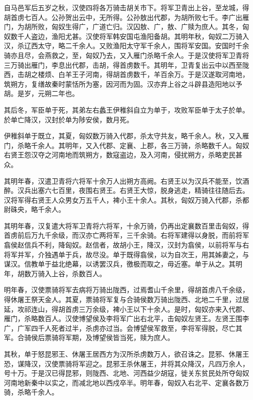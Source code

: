 \documentclass[12pt,UTF8]{ctexbook}
\begin{document}
自马邑军后五岁之秋，汉使四将各万骑击胡关市下。将军卫青出上谷，至龙城，得胡首虏七百人。公孙贺出云中，无所得。公孙敖出代郡，为胡所败七千。李广出雁门，为胡所败，匈奴生得广，广道亡归。汉囚敖、广，敖、广赎为庶人。其冬，匈奴数千人盗边，渔阳尤甚。汉使将军韩安国屯渔阳备胡。其明年秋，匈奴二万骑入汉，杀辽西太守，略二千余人。又败渔阳太守军千余人，围将军安国。安国时千余骑亦且尽，会燕救之，至，匈奴乃去，又入雁门杀略千余人。于是汉使将军卫青将三万骑出雁门，李息出代郡，击胡，得首虏数千。其明年，卫青复出云中以西至陇西，击胡之楼烦、白羊王子河南，得胡首虏数千，羊百余万。于是汉遂取河南地，筑朔方，复缮故秦时蒙恬所为塞，因河而为固。汉亦弃上谷之斗辟县造阳地以予胡。是岁，元朔二年也。



其后冬，军臣单于死，其弟左右蠡王伊稚斜自立为单于，攻败军臣单于太子於单。於单亡降汉，汉封於单为陟安侯，数月死。



伊稚斜单于既立，其夏，匈奴数万骑入代郡，杀太守共友，略千余人。秋，又入雁门，杀略千余人。其明年，又入代郡、定襄、上郡，各三万骑，杀略数千人。匈奴右贤王怨汉夺之河南地而筑朔方，数寇盗边，及入河南，侵扰朔方，杀略吏民甚众。



其明年春，汉遣卫青将六将军十余万人出朔方高阙。右贤王以为汉兵不能至，饮酒醉。汉兵出塞六七百里，夜围右贤王。右贤王大惊，脱身逃走，精骑往往随后去。汉将军得右贤王人众男女万五千人，裨小王十余人。其秋，匈奴万骑入代郡，杀都尉硃央，略千余人。



其明年春，汉复遣大将军卫青将六将军，十余万骑，仍再出定襄数百里击匈奴，得首虏前后万九千余级，而汉亦亡两将军，三千余骑。右将军建得以身脱，而前将军翕侯赵信兵不利，降匈奴。赵信者，故胡小王，降汉，汉封为翕侯，以前将军与右将军并军，介独遇单于兵，故尽没。单于既得翕侯，以为自次王，用其姊妻之，与谋汉。信教单于益北绝幕，以诱罢汉兵，徼极而取之，毋近塞。单于从之。其明年，胡数万骑入上谷，杀数百人。



明年春，汉使票骑将军去病将万骑出陇西，过焉耆山千余里，得胡首虏八千余级，得休屠王祭天金人。其夏，票骑将军复与合骑侯数万骑出陇西、北地二千里，过居延，攻祁连山，得胡首虏三万余级，裨小王以下十余人。是时，匈奴亦来入代郡、雁门，杀略数百人。汉使博望侯及李将军广出右北平，击匈奴左贤王。左贤王围李广，广军四千人死者过半，杀虏亦过当。会博望侯军救至，李将军得脱，尽亡其军。合骑侯后票骑将军期，及博望侯皆当死，赎为庶人。



其秋，单于怒昆邪王、休屠王居西方为汉所杀虏数万人，欲召诛之。昆邪、休屠王恐，谋降汉，汉使票骑将军迎之。昆邪王杀休屠王，并将其众降汉，凡四万余人，号十万。于是汉已得昆邪，则陇西、北地、河西益少胡寇，徙关东贫民处所夺匈奴河南地新秦中以实之，而减北地以西戍卒半。明年春，匈奴入右北平、定襄各数万骑，杀略千余人。
\end{document}
